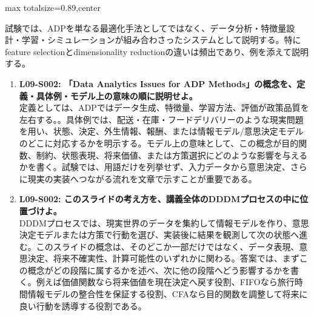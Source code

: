 \begin{minipage}[t]{0.58\textwidth}
\begin{adjustbox}{max totalsize={\textwidth}{0.89\textheight},center}
\begin{minipage}{\textwidth}
試験では、ADPを単なる最適化手法としてではなく、データ分析・特徴量設計・学習・シミュレーションが組み合わさったシステムとして説明する。特にfeature selectionとdimensionality reductionの違いは頻出であり、例を添えて説明する。\par{}\begin{enumerate}\item \textbf{L09-S002: 「Data Analytics Issues for ADP Methods」の概念を、定義・具体例・モデル上の意味の順に説明せよ。}\\定義としては、ADPではデータ生成、特徴量、学習方法、評価が政策品質を左右する。。具体例では、配送・在庫・フードデリバリーのような現実問題を用い、状態、決定、外生情報、報酬、または情報モデル/意思決定モデルのどこに対応するかを明示する。モデル上の意味として、この概念が目的関数、制約、状態表現、将来価値、または方策選択にどのような影響を与えるかを書く。試験では、用語だけを列挙せず、入力データから意思決定、さらに現実の実装へつながる流れを文章で示すことが重要である。\item \textbf{L09-S002: このスライドの考え方を、講義全体のDDDMプロセスの中に位置づけよ。}\\DDDMプロセスでは、現実世界のデータを集約して情報モデルを作り、意思決定モデルまたは方策で行動を選び、実装後に結果を観測して次の状態へ進む。このスライドの概念は、そのどこか一部だけではなく、データ表現、意思決定、将来不確実性、計算可能性のいずれかに関わる。答案では、まずこの概念がどの段階に属するかを述べ、次に他の段階へどう影響するかを書く。例えば価値関数なら将来価値を現在決定へ戻す役割、FIFOなら旅行時間情報モデルの整合性を保証する役割、CFAなら目的関数を調整して将来に良い行動を誘導する役割である。\end{enumerate}
\end{minipage}
\end{adjustbox}
\end{minipage}


